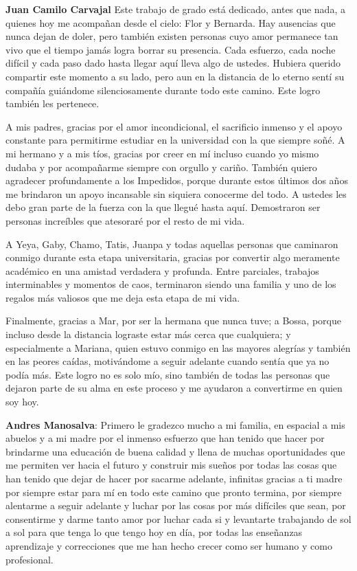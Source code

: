 \textbf{Juan Camilo Carvajal} Este trabajo de grado está dedicado, antes que nada, a quienes hoy me acompañan desde el cielo: Flor y Bernarda. Hay ausencias que nunca dejan de doler, pero también existen personas cuyo amor permanece tan vivo que el tiempo jamás logra borrar su presencia. Cada esfuerzo, cada noche difícil y cada paso dado hasta llegar aquí lleva algo de ustedes. Hubiera querido compartir este momento a su lado, pero aun en la distancia de lo eterno sentí su compañía guiándome silenciosamente durante todo este camino. Este logro también les pertenece.

A mis padres, gracias por el amor incondicional, el sacrificio inmenso y el apoyo constante para permitirme estudiar en la universidad con la que siempre soñé. A mi hermano y a mis tíos, gracias por creer en mí incluso cuando yo mismo dudaba y por acompañarme siempre con orgullo y cariño. También quiero agradecer profundamente a los Impedidos, porque durante estos últimos dos años me brindaron un apoyo incansable sin siquiera conocerme del todo. A ustedes les debo gran parte de la fuerza con la que llegué hasta aquí. Demostraron ser personas increíbles que atesoraré por el resto de mi vida.

A Yeya, Gaby, Chamo, Tatis, Juanpa y todas aquellas personas que caminaron conmigo durante esta etapa universitaria, gracias por convertir algo meramente académico en una amistad verdadera y profunda. Entre parciales, trabajos interminables y momentos de caos, terminaron siendo una familia y uno de los regalos más valiosos que me deja esta etapa de mi vida.

Finalmente, gracias a Mar, por ser la hermana que nunca tuve; a Bossa, porque incluso desde la distancia lograste estar más cerca que cualquiera; y especialmente a Mariana, quien estuvo conmigo en las mayores alegrías y también en las peores caídas, motivándome a seguir adelante cuando sentía que ya no podía más. Este logro no es solo mío, sino también de todas las personas que dejaron parte de su alma en este proceso y me ayudaron a convertirme en quien soy hoy.

\textbf{Andres Manosalva}: Primero le gradezco mucho a mi familia, en espacial a mis abuelos y a mi madre por el inmenso esfuerzo que han tenido que hacer por brindarme una educación de buena calidad y llena de muchas oportunidades que me permiten ver hacia el futuro y construir mis sueños por todas las cosas que han tenido que dejar de hacer por sacarme adelante, infinitas gracias a ti madre por siempre estar para mí en todo este camino que pronto termina, por siempre alentarme a seguir adelante y luchar por las cosas por más difíciles que sean, por consentirme y darme tanto amor por luchar cada si y levantarte trabajando de sol a sol para que tenga lo que tengo hoy en día, por todas las enseñanzas aprendizaje y correcciones que me han hecho crecer como ser humano y como profesional.

